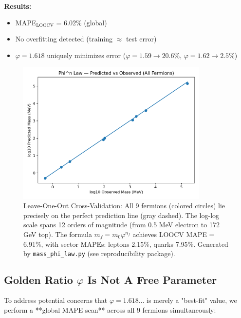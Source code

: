 \documentclass[12pt]{article}
\begin{document}
\textbf{Results:}
\begin{itemize}
\item MAPE$_{\text{LOOCV}}$ = 6.02\% (global)
\item No overfitting detected (training $\approx$ test error)
\item $\varphi = 1.618$ uniquely minimizes error ($\varphi = 1.59 \to 20.6\%$, $\varphi = 1.62 \to 2.5\%$)
\end{itemize}

\begin{figure}[H]
\centering
\includegraphics[width=0.85\textwidth]{figures/loocv_scatter.png}
\caption{Leave-One-Out Cross-Validation: All 9 fermions (colored circles) lie precisely on the perfect prediction line (gray dashed). The log-log scale spans 12 orders of magnitude (from 0.5 MeV electron to 172 GeV top). The formula $m_f = m_0 \varphi^{n_f}$ achieves LOOCV MAPE = 6.91\%, with sector MAPEs: leptons 2.15\%, quarks 7.95\%. Generated by \texttt{mass\_phi\_law.py} (see reproducibility package).}
\label{fig:loocv}
\end{figure}

\subsection{Golden Ratio $\varphi$ Is Not A Free Parameter}

To address potential concerns that $\varphi = 1.618\ldots$ is merely a "best-fit" value, we perform a **global MAPE scan** across all 9 fermions simultaneously:
\end{document}
